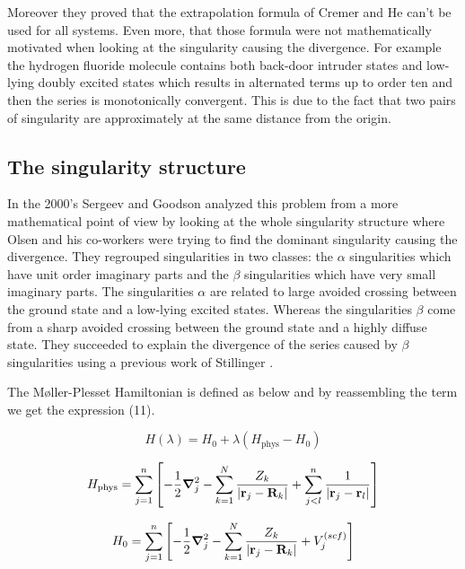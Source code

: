 \documentclass[11pt,a4paper]{article}
\begin{document}
{Moreover they proved that the extrapolation formula of Cremer and He \cite{Cremer_1996} can't be used for all systems. Even more, that those formula were not mathematically motivated when looking at the singularity causing the divergence. For example the hydrogen fluoride molecule contains both back-door intruder states and low-lying doubly excited states which results in alternated terms up to order ten and then the series is monotonically convergent. This is due to the fact that two pairs of singularity are approximately at the same distance from the origin.

\subsection{The singularity structure}

In the 2000's Sergeev and Goodson \cite{Sergeev_2005, Sergeev_2006}  analyzed this problem from a more mathematical point of view by looking at the whole singularity structure where Olsen and his co-workers were trying to find the dominant singularity causing the divergence. They regrouped singularities in two classes: the $\alpha$ singularities which have unit order imaginary parts and the $\beta$ singularities which have very small imaginary parts. The singularities $\alpha$ are related to large avoided crossing between the ground state and a low-lying excited states. Whereas the singularities $\beta$ come from a sharp avoided crossing between the ground state and a highly diffuse state. They succeeded to explain the divergence of the series caused by $\beta$ singularities using a previous work of Stillinger \cite{Stillinger_2000}. 

The M{\o}ller-Plesset Hamiltonian is defined as below and by reassembling the term we get the expression (11).

\begin{equation}
H(\lambda)=H_0 + \lambda (H_\text{phys} - H_0)    
\end{equation}

\begin{equation}
    H_\text{phys}=\sum\limits_{j=1}^{n}\left[ -\frac{1}{2}\grad_j^2 - \sum\limits_{k=1}^{N} \frac{Z_k}{|\vb{r}_j-\vb{R}_k|}+\sum\limits_{j<l}^{n}\frac{1}{|\vb{r}_j-\vb{r}_l|}\right]
\end{equation}

\begin{equation}
    H_0=\sum\limits_{j=1}^{n}\left[ -\frac{1}{2}\grad_j^2 - \sum\limits_{k=1}^{N} \frac{Z_k}{|\vb{r}_j-\vb{R}_k|}+V_j^{(scf)}\right]
\end{equation}

}
\end{document}
